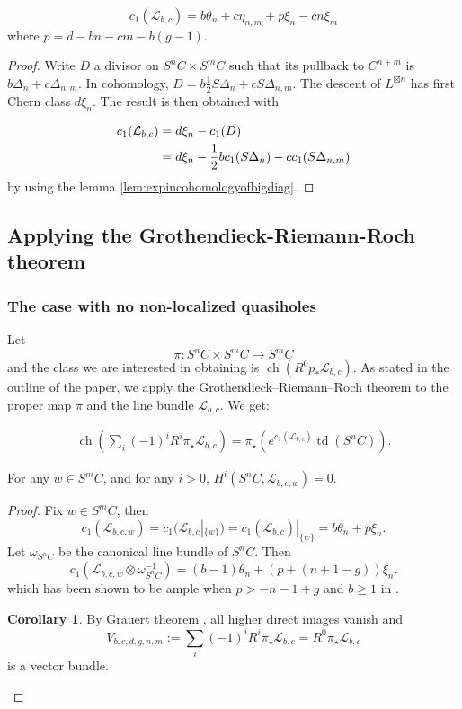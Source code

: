 \documentclass{article}
\theoremstyle{definition}
\newtheorem{corollary}{Corollary}
\DeclareMathOperator{\ch}{ch}
\DeclareMathOperator{\td}{td}
\newcommand{\eq}[2][1]{
\begin{equation*}
	\addtolength{\fboxsep}{0pt}
	\begin{alignedat}{#1}
	#2
	\end{alignedat}
\end{equation*}
}
\newcommand{\eqtag}[3][1]{
\begin{equation}
   \label{#3}
	\begin{alignedat}{#1}
	#2
	\end{alignedat}
\end{equation}
}
\begin{document}
\begin{proposition}
\label{prop:firstcherclassunivquasiholebundle}
    $$c_1(\mathcal{L}_{b,c})=b\theta_n + c \eta_{n,m} + p \xi_n  -cn\xi_m$$ where $p=d-bn-cm-b(g-1)$.
\end{proposition} 


\begin{proof}
Write $D$ a divisor on $S^nC \times S^m C$ such that its pullback to $C^{n+m}$ is $b\Delta_n+c\Delta_{n,m}$. In cohomology, $D=b \frac{1}{2}S\Delta_n+c S\Delta_{n,m}$. The descent of $L^{\boxtimes n}$ has first Chern class $d\xi_n$. The result is then obtained with
\eq{c_1(\mathcal{L}_{b,c})&=d\xi_n-c_1(D)\\
    &=d\xi_n - \frac{1}{2}b c_1(S\Delta_n)-c c_1(S\Delta_{n,m})
    } by using the lemma \ref{lem:expincohomologyofbigdiag}.
\end{proof}


\subsection{Applying the Grothendieck-Riemann-Roch theorem}
\label{subsec:applyinggrr}

\subsubsection{The case with no non-localized quasiholes}

Let
$$\pi: S^{n} C \times S^m C  \to  S^m C$$
and the class we are interested in obtaining is $\ch(R^0p_*\mathcal{L}_{b,c})$. As stated in the outline of the paper, we apply the Grothendieck–Riemann–Roch theorem to the proper map $\pi$ and the line bundle $\mathcal{L}_{b,c}$. We get:

\eqtag{\ch\left(\sum_i (-1)^i R^i \pi_\star \mathcal{L}_{b,c}\right)=\pi_\star \left(e^{c_1(\mathcal{L}_{b,c})} \td\left(S^{n}C\right)\right).}{eq:GRR}

\begin{theorem}
    For any $w \in S^m C$, and for any $i>0$, $H^i(S^n C,\mathcal{L}_{b,c,w})=0$.
\end{theorem}

\begin{proof}
Fix $w \in S^m C$, then $$c_1(\mathcal{L}_{b,c,w})=c_1(\mathcal{L}_{b,c}|_{\lbrace w\rbrace})=c_1(\mathcal{L}_{b,c})|_{{\lbrace w\rbrace}}=b\theta_n+p\xi_n.$$
Let $\omega_{S^n C}$ be the canonical line bundle of $S^n C$. Then $$c_1(\mathcal{L}_{b,c,w} \otimes \omega_{S^n C}^{-1})=(b-1)\theta_n+(p+(n+1-g))\xi_n.$$ which has been shown to be ample when $p>-n-1+g$ and $b\geqslant 1$ in \cite{Klevtsov_Zvonkine_2025}.



\begin{corollary}
    By Grauert theorem \cite[Corollary 12.9]{Hartshorne_1977}, all higher direct images vanish and $$V_{b,c,d,g,n,m}:=\sum_i (-1)^iR^i \pi_\star \mathcal{L}_{b,c} = R^0 \pi_\star \mathcal{L}_{b,c} $$ is a vector bundle.
\end{corollary}



\end{proof}
\end{document}
